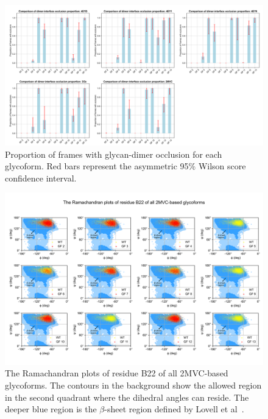\documentclass[sn-vancouver]{sn-jnl}
\begin{document}
\renewcommand{\thefigure}{S\arabic{figure}}
\begin{figure}[H]
\centering
\includegraphics[width=1.0\textwidth]{Figures/occlusion_proportion_models_2.png}
\caption{Proportion of frames with glycan-dimer occlusion for each glycoform. Red bars represent the asymmetric 95\% Wilson score confidence interval.}
\label{supple_fig: occlusion_binomial}
\end{figure}

\renewcommand{\thefigure}{S\arabic{figure}}
\begin{figure}[H]
\centering
\includegraphics[width=\textwidth]{Figures/2MVC_multi_rama_plot_res_43.png}
\caption{The Ramachandran plots of residue B22 of all 2MVC-based glycoforms. The contours in the background show the allowed region in the second quadrant where the dihedral angles can reside. The deeper blue region is the $\beta$-sheet region defined by Lovell et al~\cite{lovell2003structure}.}
\end{figure}
\end{document}
